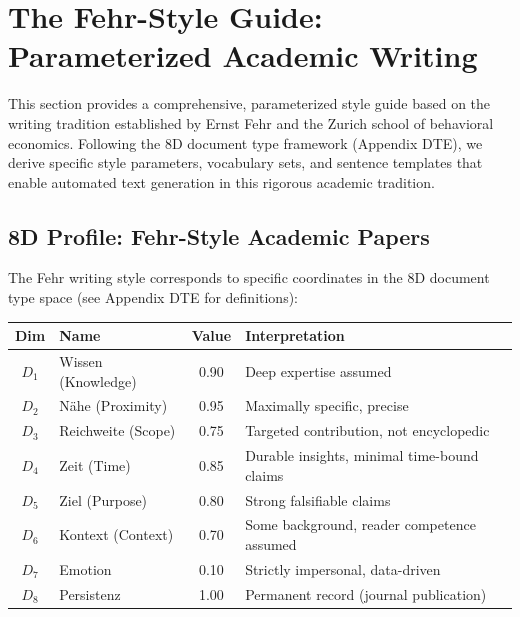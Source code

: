 
\section{The Fehr-Style Guide: Parameterized Academic Writing}
\label{sec:fehr-style-guide}

This section provides a comprehensive, parameterized style guide based on the
writing tradition established by Ernst Fehr and the Zurich school of behavioral
economics. Following the 8D document type framework (Appendix DTE), we derive
specific style parameters, vocabulary sets, and sentence templates that enable
automated text generation in this rigorous academic tradition.

\subsection{8D Profile: Fehr-Style Academic Papers}

The Fehr writing style corresponds to specific coordinates in the 8D document
type space (see Appendix DTE for definitions):

\begin{center}
\renewcommand{\arraystretch}{1.3}
\begin{tabular}{clcl}
\toprule
\textbf{Dim} & \textbf{Name} & \textbf{Value} & \textbf{Interpretation} \\
\midrule
$D_1$ & Wissen (Knowledge) & 0.90 & Deep expertise assumed \\
$D_2$ & Nähe (Proximity) & 0.95 & Maximally specific, precise \\
$D_3$ & Reichweite (Scope) & 0.75 & Targeted contribution, not encyclopedic \\
$D_4$ & Zeit (Time) & 0.85 & Durable insights, minimal time-bound claims \\
$D_5$ & Ziel (Purpose) & 0.80 & Strong falsifiable claims \\
$D_6$ & Kontext (Context) & 0.70 & Some background, reader competence assumed \\
$D_7$ & Emotion & 0.10 & Strictly impersonal, data-driven \\
$D_8$ & Persistenz & 1.00 & Permanent record (journal publication) \\
\bottomrule
\end{tabular}
\end{center}

